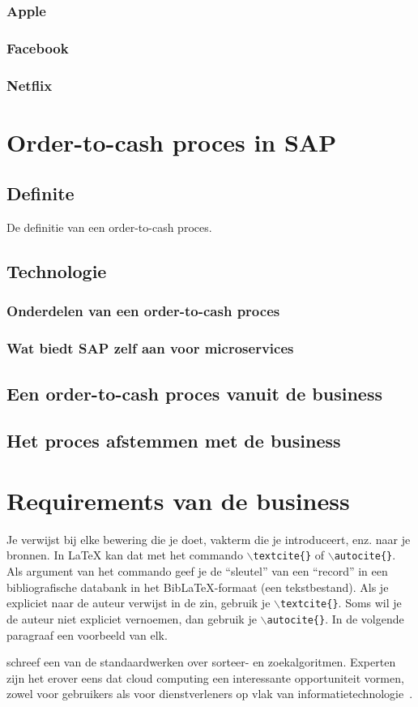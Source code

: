 \subsubsection{Apple}
\subsubsection{Facebook}
\subsubsection{Netflix}

\section{Order-to-cash proces in SAP}
\subsection{Definite}
De definitie van een order-to-cash proces.
\subsection{Technologie}
\subsubsection{Onderdelen van een order-to-cash proces}
\subsubsection{Wat biedt SAP zelf aan voor microservices}
\subsection{Een order-to-cash proces vanuit de business}
\subsection{Het proces afstemmen met de business}

\section{Requirements van de business}
Je verwijst bij elke bewering die je doet, vakterm die je introduceert, enz. naar je bronnen. In \LaTeX{} kan dat met het commando \texttt{$\backslash${textcite\{\}}} of \texttt{$\backslash${autocite\{\}}}. Als argument van het commando geef je de ``sleutel'' van een ``record'' in een bibliografische databank in het Bib\LaTeX{}-formaat (een tekstbestand). Als je expliciet naar de auteur verwijst in de zin, gebruik je \texttt{$\backslash${}textcite\{\}}.
Soms wil je de auteur niet expliciet vernoemen, dan gebruik je \texttt{$\backslash${}autocite\{\}}. In de volgende paragraaf een voorbeeld van elk.

\textcite{Knuth1998} schreef een van de standaardwerken over sorteer- en zoekalgoritmen. Experten zijn het erover eens dat cloud computing een interessante opportuniteit vormen, zowel voor gebruikers als voor dienstverleners op vlak van informatietechnologie~\autocite{Creeger2009}.

\lipsum[7-20]
